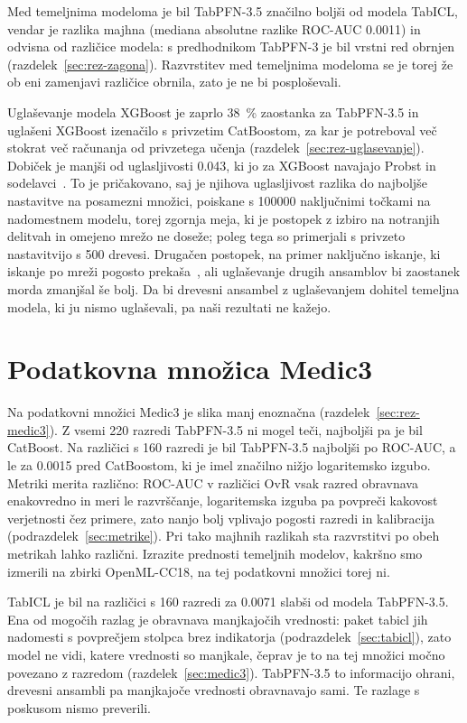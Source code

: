 \documentclass[a4paper,12pt,openright]{book}
\begin{document}
Med temeljnima modeloma je bil TabPFN-3.5 značilno boljši od modela TabICL,
vendar je razlika majhna (mediana absolutne razlike ROC-AUC \num{0.0011}) in
odvisna od različice modela: s predhodnikom TabPFN-3 je bil vrstni red obrnjen
(razdelek~\ref{sec:rez-zagona}). Razvrstitev med temeljnima modeloma se je
torej že ob eni zamenjavi različice obrnila, zato je ne bi posploševali.

Uglaševanje modela XGBoost je zaprlo \SI{38}{\percent} zaostanka za
TabPFN-3.5 in uglašeni XGBoost izenačilo s privzetim CatBoostom, za kar je
potreboval več stokrat več računanja od privzetega učenja
(razdelek~\ref{sec:rez-uglasevanje}). Dobiček je manjši od uglasljivosti
\num{0.043}, ki jo za XGBoost navajajo Probst in
sodelavci~\cite{probst2019tunability}. To je pričakovano, saj je njihova
uglasljivost razlika do najboljše nastavitve na posamezni množici, poiskane s
\num{100000} naključnimi točkami na nadomestnem modelu, torej zgornja meja, ki
je postopek z izbiro na notranjih delitvah in omejeno mrežo ne doseže; poleg
tega so primerjali s privzeto nastavitvijo s 500 drevesi. Drugačen postopek,
na primer naključno iskanje, ki iskanje po mreži pogosto
prekaša~\cite{bischl2023hyperparameter}, ali uglaševanje drugih ansamblov bi
zaostanek morda zmanjšal še bolj. Da bi drevesni ansambel z uglaševanjem
dohitel temeljna modela, ki ju nismo uglaševali, pa naši rezultati ne kažejo.

\section{Podatkovna množica Medic3}
\label{sec:disk-medic3}

Na podatkovni množici Medic3 je slika manj enoznačna
(razdelek~\ref{sec:rez-medic3}). Z vsemi 220 razredi TabPFN-3.5 ni mogel teči,
najboljši pa je bil CatBoost. Na različici s 160 razredi je bil TabPFN-3.5
najboljši po ROC-AUC, a le za \num{0.0015} pred CatBoostom, ki je imel značilno
nižjo logaritemsko izgubo. Metriki merita različno: ROC-AUC v različici OvR
vsak razred obravnava enakovredno in meri le razvrščanje, logaritemska izguba
pa povpreči kakovost verjetnosti čez primere, zato nanjo bolj vplivajo pogosti
razredi in kalibracija (podrazdelek~\ref{sec:metrike}). Pri tako majhnih
razlikah sta razvrstitvi po obeh metrikah lahko različni. Izrazite prednosti
temeljnih modelov, kakršno smo izmerili na zbirki OpenML-CC18, na tej
podatkovni množici torej ni.

TabICL je bil na različici s 160 razredi za \num{0.0071} slabši od modela
TabPFN-3.5. Ena od mogočih razlag je obravnava manjkajočih vrednosti: paket
tabicl jih nadomesti s povprečjem stolpca brez indikatorja
(podrazdelek~\ref{sec:tabicl}), zato model ne vidi, katere vrednosti so
manjkale, čeprav je to na tej množici močno povezano z razredom
(razdelek~\ref{sec:medic3}). TabPFN-3.5 to informacijo ohrani, drevesni
ansambli pa manjkajoče vrednosti obravnavajo sami. Te razlage s poskusom nismo
preverili.
\end{document}
